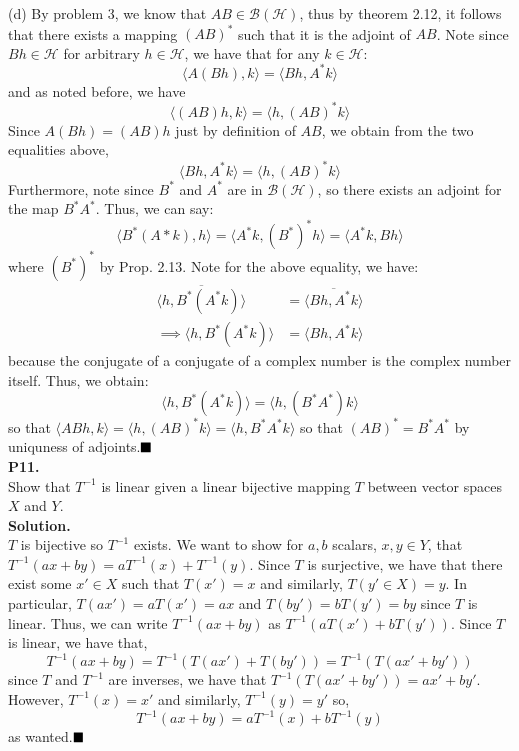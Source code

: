 \documentclass{article}
\begin{document}
     \newpage

     (d) By problem 3, we know that $AB\in\mathcal{B}(\mathcal{H})$, thus by theorem 2.12, it follows that there exists a mapping
     $(AB)^*$ such that it is the adjoint of $AB$. Note since $Bh\in\mathcal{H}$ for arbitrary $h\in\mathcal{H}$, we have that
     for any $k\in\mathcal{H}$:
     \[ \langle A(Bh),k\rangle = \langle Bh,A^*k\rangle \]
     and as noted before, we have
     \[ \langle (AB)h,k\rangle = \langle h,(AB)^*k\rangle \]
     Since $A(Bh) = (AB)h$ just by definition of $AB$, we obtain from the two equalities above,
     \[ \langle Bh, A^* k\rangle = \langle h,(AB)^*k\rangle \]
     Furthermore, note since $B^*$ and $A^*$ are in $\mathcal{B}(\mathcal{H})$, so there exists an adjoint for the map
     $B^* A^*$. Thus, we can say:
     \[ \langle B^*(A* k),h\rangle = \langle A^* k, (B^*)^* h\rangle = \langle A^*k,Bh\rangle \]
     where $(B^*)^*$ by Prop. 2.13. Note for the above equality, we have:
     \begin{align*}
         \overline{\langle h, B^*(A^* k)\rangle} &= \overline{\langle Bh, A^*k\rangle} \\
         \implies \langle h,B^*(A^*k)\rangle &= \langle Bh,A^*k\rangle
     \end{align*}
     because the conjugate of a conjugate of a complex number is the complex number itself. Thus, we obtain:
     \[ \langle h,B^*(A^*k)\rangle = \langle h,(B^*A^*)k\rangle \]
     so that $\langle ABh,k\rangle = \langle h,(AB)^*k\rangle = \langle h,B^*A^*k\rangle$ so that $(AB)^* = B^* A^*$ by uniquness
     of adjoints.$\hfill\blacksquare$\\

     \textbf{P11.}\\

     Show that $T^{-1}$ is linear given a linear bijective mapping $T$ between vector spaces $X$ and $Y$.\\

     \textbf{Solution.}\\

     $T$ is bijective so $T^{-1}$ exists. We want to show for $a,b$ scalars, $x,y\in Y$, that $T^{-1}(ax+by) = aT^{-1}(x)+T^{-1}(y)$.
     Since $T$ is surjective, we have that there exist some $x'\in X$ such that $T(x') = x$ and similarly,
     $T(y'\in X) = y$. In particular, $T(ax') = aT(x') = ax$ and $T(by') = bT(y') = by$ since $T$ is linear. Thus, we can
     write $T^{-1}(ax+by)$ as $T^{-1}(aT(x') + bT(y'))$. Since $T$ is linear, we have that,
     \[ T^{-1}(ax+by) = T^{-1}(T(ax') + T(by')) = T^{-1}(T(ax'+by')) \]
     since $T$ and $T^{-1}$ are inverses, we have that $T^{-1}(T(ax'+by')) = ax' + by'$. However, $T^{-1}(x) = x'$ and similarly,
     $T^{-1}(y) = y'$ so,
     \[ T^{-1}(ax+by) = aT^{-1}(x) + bT^{-1}(y) \]
     as wanted.$\hfill\blacksquare$
\end{document}
